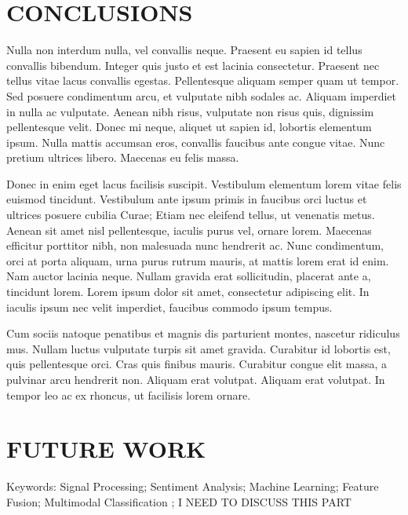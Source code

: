 \chapter{CONCLUSIONS}
 
Nulla non interdum nulla, vel convallis neque. Praesent eu sapien id tellus convallis bibendum. Integer quis justo et est lacinia consectetur. Praesent nec tellus vitae lacus convallis egestas. Pellentesque aliquam semper quam ut tempor. Sed posuere condimentum arcu, et vulputate nibh sodales ac. Aliquam imperdiet in nulla ac vulputate. Aenean nibh risus, vulputate non risus quis, dignissim pellentesque velit. Donec mi neque, aliquet ut sapien id, lobortis elementum ipsum. Nulla mattis accumsan eros, convallis faucibus ante congue vitae. Nunc pretium ultrices libero. Maecenas eu felis massa.

Donec in enim eget lacus facilisis suscipit. Vestibulum elementum lorem vitae felis euismod tincidunt. Vestibulum ante ipsum primis in faucibus orci luctus et ultrices posuere cubilia Curae; Etiam nec eleifend tellus, ut venenatis metus. Aenean sit amet nisl pellentesque, iaculis purus vel, ornare lorem. Maecenas efficitur porttitor nibh, non malesuada nunc hendrerit ac. Nunc condimentum, orci at porta aliquam, urna purus rutrum mauris, at mattis lorem erat id enim. Nam auctor lacinia neque. Nullam gravida erat sollicitudin, placerat ante a, tincidunt lorem. Lorem ipsum dolor sit amet, consectetur adipiscing elit. In iaculis ipsum nec velit imperdiet, faucibus commodo ipsum tempus.

Cum sociis natoque penatibus et magnis dis parturient montes, nascetur ridiculus mus. Nullam luctus vulputate turpis sit amet gravida. Curabitur id lobortis est, quis pellentesque orci. Cras quis finibus mauris. Curabitur congue elit massa, a pulvinar arcu hendrerit non. Aliquam erat volutpat. Aliquam erat volutpat. In tempor leo ac ex rhoncus, ut facilisis lorem ornare.


\chapter{FUTURE WORK}
Keywords: Signal Processing; Sentiment Analysis; Machine Learning; 
Feature Fusion; Multimodal Classification ; I NEED TO DISCUSS THIS PART